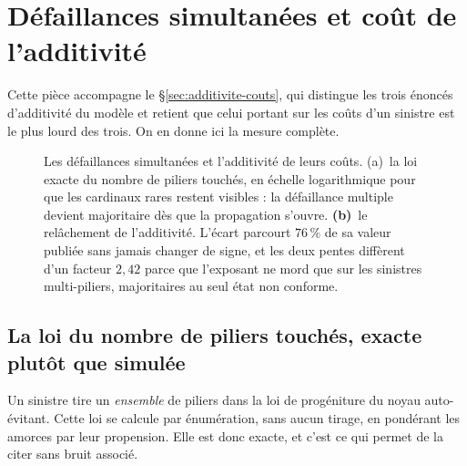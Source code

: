 \section{Défaillances simultanées et coût de l'additivité}
\label{sec:ann-additivite}


Cette pièce accompagne le \S\ref{sec:additivite-couts}, qui distingue les trois énoncés
d'additivité du modèle et retient que celui portant sur les coûts d'un sinistre est le plus lourd
des trois. On en donne ici la mesure complète.

\begin{figure}[!tb]\centering
{}
\caption{Les défaillances simultanées et l'additivité de leurs coûts. (a)~la loi exacte
du nombre de piliers touchés, en échelle logarithmique pour que les cardinaux rares restent
visibles : la défaillance multiple devient majoritaire dès que la propagation s'ouvre.
\textbf{(b)}~le relâchement de l'additivité. L'écart parcourt $76\,\%$ de sa valeur publiée sans
jamais changer de signe, et les deux pentes diffèrent d'un facteur $2{,}42$ parce que l'exposant ne
mord que sur les sinistres multi-piliers, majoritaires au seul état non conforme.}
\label{fig:additivite-couts}
\end{figure}

\subsection*{La loi du nombre de piliers touchés, exacte plutôt que simulée}

Un sinistre tire un \emph{ensemble} de piliers dans la loi de progéniture du noyau auto-évitant.
Cette loi se calcule par énumération, sans aucun tirage, en pondérant les amorces par leur
propension. Elle est donc exacte, et c'est ce qui permet de la citer sans bruit associé.

